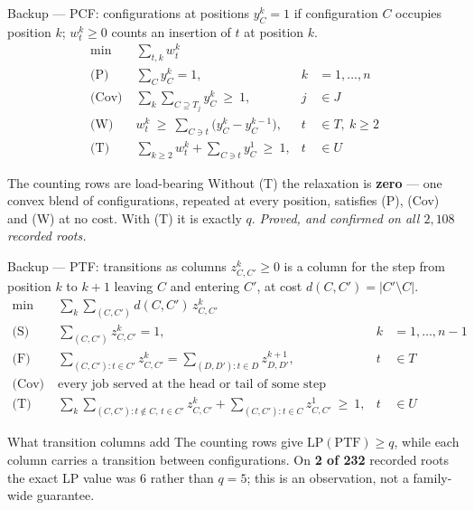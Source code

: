 \documentclass[aspectratio=169,10pt]{beamer}
\newcommand{\U}{U}
\begin{document}
\begin{frame}{Backup --- PCF: configurations at positions}
\vspace{0.18cm}
$y_C^{k}=1$ if configuration $C$ occupies position $k$; $w_t^{k}\ge0$ counts an
insertion of $t$ at position $k$.
\vspace{0.15cm}
{\small
\[
\begin{aligned}
\min\;\; & \textstyle\sum_{t,k}w_t^{k} &&\\
\text{(P)}\;\; & \textstyle\sum_C y_C^{k}=1, & k&=1,\dots,n\\
\text{(Cov)}\; & \textstyle\sum_k\sum_{C\supseteq T_j}y_C^{k}\ \ge\ 1, & j&\in J\\
\text{(W)}\;\; & w_t^{k}\ \ge\ \textstyle\sum_{C\ni t}\bigl(y_C^{k}-y_C^{k-1}\bigr), & t&\in T,\ k\ge2\\
\text{(T)}\;\; & \textstyle\sum_{k\ge2}w_t^{k}+\sum_{C\ni t}y_C^{1}\ \ge\ 1, & t&\in\U
\end{aligned}
\]}
\vspace{-0.06cm}
\begin{block}{The counting rows are load-bearing}
Without (T) the relaxation is \textbf{zero} --- one convex blend of configurations,
repeated at every position, satisfies (P), (Cov) and (W) at no cost. With (T) it is
exactly $q$. \emph{Proved, and confirmed on all $2{,}108$ recorded roots.}
\end{block}
\end{frame}

\begin{frame}{Backup --- PTF: transitions as columns}
\vspace{0.18cm}
$z_{C,C'}^{k}\ge0$ is a column for the step from position $k$ to $k+1$ leaving $C$ and
entering $C'$, at cost $d(C,C')=\lvert C'\setminus C\rvert$.
\vspace{0.12cm}
{\small
\[
\begin{aligned}
\min\;\; & \textstyle\sum_{k}\sum_{(C,C')}d(C,C')\,z_{C,C'}^{k} &&\\
\text{(S)}\;\; & \textstyle\sum_{(C,C')}z_{C,C'}^{k}=1, & k&=1,\dots,n-1\\
\text{(F)}\;\; & \textstyle\sum_{(C,C'):t\in C'}z^{k}_{C,C'}=\sum_{(D,D'):t\in D}z^{k+1}_{D,D'}, & t&\in T\\
\text{(Cov)}\; & \text{every job served at the head or tail of some step} &&\\
\text{(T)}\;\; & \textstyle\sum_{k}\sum_{(C,C'):t\notin C,\,t\in C'}z^{k}_{C,C'}+\sum_{(C,C'):t\in C}z^{1}_{C,C'}\ \ge\ 1, & t&\in\U
\end{aligned}
\]}
\vspace{-0.06cm}
\begin{block}{What transition columns add}
The counting rows give $\mathrm{LP}(\mathrm{PTF})\ge q$, while each column carries a
transition between configurations. On \textbf{2 of 232} recorded roots the exact LP
value was $6$ rather than $q=5$; this is an observation, not a family-wide guarantee.
\end{block}
\end{frame}
\end{document}
